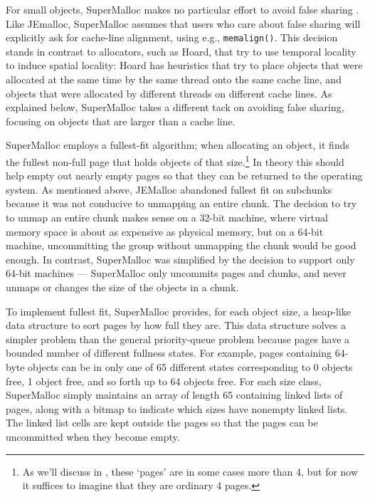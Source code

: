 \documentclass[natbib,sort&compress,10pt]{sigplanconf}
\newcommand{\code}[1]{\texttt{#1}}
\begin{document}
For small objects, SuperMalloc makes no particular effort to avoid
false sharing \cite{BoloskySc93}.  Like JEmalloc, SuperMalloc assumes
that users who care about false sharing will explicitly ask for
cache-line alignment, using e.g., \code{memalign()}.  This
decision stands in contrast to allocators, such as Hoard, that try to
use temporal locality to induce spatial locality: Hoard has heuristics
that try to place objects that were allocated at the same time by the
same thread onto the same cache line, and objects that were allocated
by different threads on different cache lines.  As explained below,
SuperMalloc takes a different tack on avoiding false sharing, focusing
on objects that are larger than a cache line.

SuperMalloc employs a fullest-fit algorithm; when allocating an
object, it finds the fullest non-full page that holds objects of that
size.\footnote{As we'll discuss in , these `pages' are
  in some cases more than \unit{4}\kibi\byte, but for now it suffices
  to imagine that they are ordinary \unit{4}\kibi\byte{} pages.}  In
theory this should help empty out nearly empty pages so that they can
be returned to the operating system.  As mentioned above, JEMalloc
abandoned fullest fit on subchunks because it was not conducive to
unmapping an entire chunk.  The decision to try to unmap an entire
chunk makes sense on a 32-bit machine, where virtual memory space is
about as expensive as physical memory, but on a 64-bit machine,
uncommitting the group without unmapping the chunk would be good
enough.  In contrast, SuperMalloc was simplified by the decision to
support only 64-bit machines --- SuperMalloc only uncommits pages and
chunks, and never unmaps or changes the size of the objects in a
chunk.

To implement fullest fit, SuperMalloc provides, for each object size,
a heap-like data structure to sort pages by how full they are.  This
data structure solves a simpler problem than the general
priority-queue problem because pages have a bounded number of
different fullness states.  For example, pages containing 64-byte
objects can be in only one of 65 different states corresponding to 0
objects free, 1 object free, and so forth up to 64 objects free.  For
each size class, SuperMalloc simply maintains an array of length 65
containing linked lists of pages, along with a bitmap to indicate
which sizes have nonempty linked lists.  The linked list cells are
kept outside the pages so that the pages can be uncommitted when they
become empty.
\end{document}
